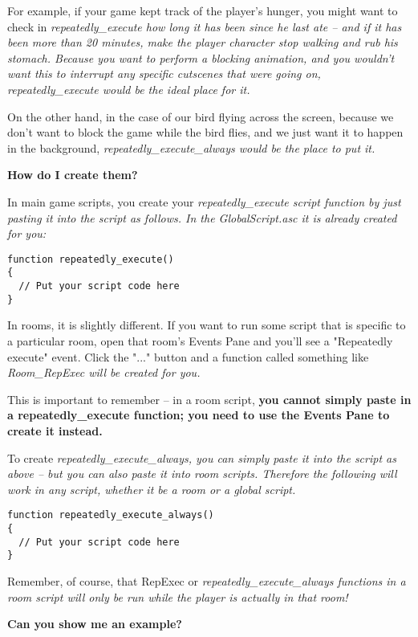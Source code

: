 For example, if your game kept track of the player's hunger, you might want to check in
\it{repeatedly_execute} how long it has been since he last ate -- and if it has been more than 20
minutes, make the player character stop walking and rub his stomach. Because you want to perform
a blocking animation, and you wouldn't want this to interrupt any specific cutscenes that were going on,
repeatedly_execute would be the ideal place for it.

On the other hand, in the case of our bird flying across the screen, because we don't want to
block the game while the bird flies, and we just want it to happen in the background,
\it{repeatedly_execute_always} would be the place to put it.

\bf{How do I create them?}

In main game scripts, you create your \it{repeatedly_execute} script function by just pasting
it into the script as follows. In the GlobalScript.asc it is already created for you:
\begin{verbatim}
function repeatedly_execute()
{
  // Put your script code here
}
\end{verbatim}
In rooms, it is slightly different. If you want to run some script that is specific to a particular
room, open that room's Events Pane and you'll see a "Repeatedly execute" event. Click the "..." button
and a function called something like \it{Room_RepExec} will be created for you.

This is important to remember -- in a room script, \bf{you cannot simply paste in a repeatedly_execute
function}; you need to use the Events Pane to create it instead.

To create \it{repeatedly_execute_always}, you can simply paste it into the script as above -- but
you can also paste it into room scripts. Therefore the following will work in any script, whether
it be a room or a global script.
\begin{verbatim}
function repeatedly_execute_always()
{
  // Put your script code here
}
\end{verbatim}
Remember, of course, that RepExec or \it{repeatedly_execute_always} functions in a room script
will only be run while the player is actually in that room!

\bf{Can you show me an example?}

